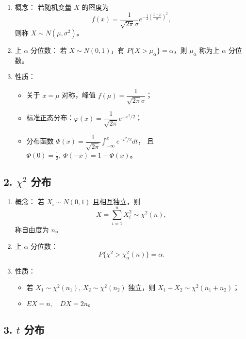 \begin{enumerate}
      \item 概念：
            若随机变量 $X$ 的密度为
            $$
                  f(x) = \frac{1}{\sqrt{2\pi}\sigma}e^{-\frac{1}{2}\left(\frac{x-\mu}{\sigma}\right)^2},
            $$
            则称 $X \sim N(\mu,\sigma^2)$。
      \item 上 $\alpha$ 分位数：
            若 $X\sim N(0,1)$，有 $P\{X > \mu_\alpha\} = \alpha$，则 $\mu_\alpha$ 称为上 $\alpha$ 分位数。
      \item 性质：
            \begin{itemize}
                  \item 关于 $x=\mu$ 对称，峰值 $f(\mu)=\dfrac{1}{\sqrt{2\pi}\sigma}$；
                  \item 标准正态分布：$\varphi(x)=\dfrac{1}{\sqrt{2\pi}}e^{-x^2/2}$；
                  \item 分布函数 $\Phi(x)=\dfrac{1}{\sqrt{2\pi}}\int_{-\infty}^{x} e^{-t^2/2}dt$，
                        且 $\Phi(0)=\frac{1}{2},\ \Phi(-x)=1-\Phi(x)$。
            \end{itemize}
\end{enumerate}


\subsection*{2. $\chi^2$ 分布}

\begin{enumerate}
      \item 概念：
            若 $X_i \sim N(0,1)$ 且相互独立，则
            $$
                  X = \sum_{i=1}^{n} X_i^2 \sim \chi^2(n),
            $$
            称自由度为 $n$。
      \item 上 $\alpha$ 分位数：
            $$P\{\chi^2 > \chi^2_\alpha(n)\} = \alpha.$$
      \item 性质：
            \begin{itemize}
                  \item 若 $X_1\sim\chi^2(n_1)$, $X_2\sim\chi^2(n_2)$ 独立，则 $X_1+X_2\sim\chi^2(n_1+n_2)$；
                  \item $E X = n,\quad D X = 2n$。
            \end{itemize}
\end{enumerate}


\subsection*{3. $t$ 分布}

